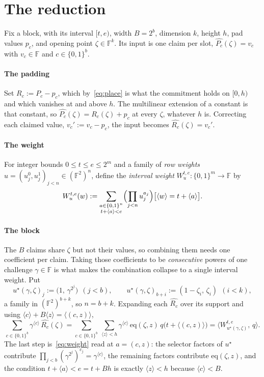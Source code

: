 \documentclass[11pt]{article}
\newcommand{\F}{\mathbb{F}}
\newcommand{\eq}{\mathrm{eq}}
\newcommand{\cube}[1]{\{0,1\}^{#1}}
\newcommand{\pol}[1]{\widehat{#1}}
\newcommand{\val}[1]{\langle #1 \rangle}
\theoremstyle{plain}
\begin{document}
\section{The reduction}\label{sec:reduction}

Fix a block, with its interval $[t,e)$, width $B=2^b$, dimension $k$, height $h$, pad values
$p_c$, and opening point $\zeta\in\F^k$. Its input is one claim per slot,
$\pol{P_c}(\zeta)=v_c$ with $v_c\in\F$ and $c\in\cube b$.

\paragraph{The padding} Set $R_c:=P_c-p_c$, which by~\eqref{eq:place} is what the commitment holds
on $[0,h)$ and which vanishes at and above $h$. The multilinear extension of a constant is
that constant, so $\pol{P_c}(\zeta)=\pol{R_c}(\zeta)+p_c$ at every $\zeta$, whatever $h$ is.
Correcting each claimed value, $v_c':=v_c-p_c$, the input becomes $\pol{R_c}(\zeta)=v_c'$.

\paragraph{The weight} For integer bounds $0\le t\le e\le2^m$ and a family of \emph{row weights}
$u=(u_j^0,u_j^1)_{j<n}\in(\F^2)^n$, define the \emph{interval weight} $W^{t,e}_u:\cube m\to\F$
by
\begin{equation}
  W^{t,e}_u(w):=\sum_{\substack{a\in\cube n\\ t+\val a<e}}\Bigl(\prod_{j<n}u_j^{a_j}\Bigr)\bigl[\val w=t+\val a\bigr].
  \label{eq:weight}
\end{equation}

\paragraph{The block} The $B$ claims share $\zeta$ but not their values, so combining them needs
one coefficient per claim. Taking those coefficients to be \emph{consecutive} powers of one challenge
$\gamma\in\F$ is what makes the combination collapse to a single interval weight. Put
\begin{equation}
  u^{\star}(\gamma,\zeta)_j:=\bigl(1,\,\gamma^{2^j}\bigr)\ \ (j<b),\qquad u^{\star}(\gamma,\zeta)_{b+i}:=(1-\zeta_i,\,\zeta_i)\ \ (i<k),
  \label{eq:ustar}
\end{equation}
a family in $(\F^2)^{b+k}$, so $n=b+k$. Expanding each $\pol{R_c}$ over its support and using
$\val c+B\val z=\val{(c,z)}$,
\begin{equation}
  \sum_{c\in\cube b}\gamma^{\val c}\,\pol{R_c}(\zeta)
  =\sum_{c\in\cube b}\ \sum_{\val z<h}\gamma^{\val c}\,\eq(\zeta,z)\,q\bigl(t+\val{(c,z)}\bigr)
  =\bigl\langle W^{t,e}_{u^{\star}(\gamma,\zeta)},\,q\bigr\rangle .
  \label{eq:batch}
\end{equation}
The last step is~\eqref{eq:weight} read at $a=(c,z)$: the selector factors of $u^{\star}$
contribute $\prod_{j<b}(\gamma^{2^j})^{c_j}=\gamma^{\val c}$, the remaining factors contribute
$\eq(\zeta,z)$, and the condition $t+\val a<e=t+Bh$ is exactly $\val z<h$ because $\val c<B$.
\end{document}
